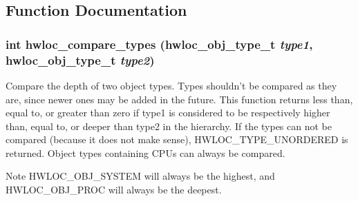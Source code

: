 \subsection{Function Documentation}
\hypertarget{group__hwlocality__types_ga1820ea0dfd8e9dca28f9ea7624df5ae2}{
\subsubsection[{hwloc\_\-compare\_\-types}]{\setlength{\rightskip}{0pt plus 5cm}int hwloc\_\-compare\_\-types ({\bf hwloc\_\-obj\_\-type\_\-t} {\em type1}, \/  {\bf hwloc\_\-obj\_\-type\_\-t} {\em type2})}}
\label{group__hwlocality__types_ga1820ea0dfd8e9dca28f9ea7624df5ae2}


Compare the depth of two object types. Types shouldn't be compared as they are, since newer ones may be added in the future. This function returns less than, equal to, or greater than zero if {\ttfamily type1} is considered to be respectively higher than, equal to, or deeper than {\ttfamily type2} in the hierarchy. If the types can not be compared (because it does not make sense), HWLOC\_\-TYPE\_\-UNORDERED is returned. Object types containing CPUs can always be compared.

\begin{DoxyNote}{Note}
HWLOC\_\-OBJ\_\-SYSTEM will always be the highest, and HWLOC\_\-OBJ\_\-PROC will always be the deepest. 
\end{DoxyNote}
